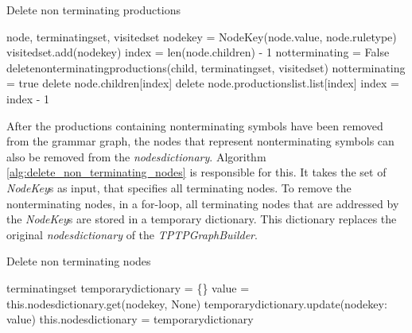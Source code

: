 \begin{algorithm}[H]
\caption{Delete non terminating productions}
\begin{algorithmic}[1] 
\Require node, terminating\textunderscore set, visited\textunderscore set
\State node\textunderscore key = Node\textunderscore Key(node.value, node.rule\textunderscore type)
	\State visited\textunderscore set.add(node\textunderscore key)
	\State index = len(node.children) - 1
		\State not\textunderscore terminating = False
			\State delete\textunderscore non\textunderscore terminating\textunderscore productions(child, terminating\textunderscore set, visited\textunderscore set)
				\State not\textunderscore terminating = true
			\EndIf
		\EndFor
			\State delete node.children[index]
			\State delete node.productions\textunderscore list.list[index]
		\EndIf
		\State index = index - 1
\EndFor
\EndIf
\end{algorithmic}
\label{alg:delete_non_terminating_productions}
\end{algorithm}

After the productions containing nonterminating symbols have been removed from the grammar graph, the nodes that represent nonterminating symbols can also be removed from the \textit{nodes\textunderscore dictionary}.
Algorithm \ref{alg:delete_non_terminating_nodes} is responsible for this. It takes the set of \textit{Node\textunderscore Key}s as input, that specifies all terminating nodes.
To remove the nonterminating nodes, in a for-loop, all terminating nodes that are addressed by the \textit{Node\textunderscore Key}s are stored in a temporary dictionary. This dictionary replaces the original \textit{nodes\textunderscore dictionary} of the \textit{TPTPGraphBuilder}.
\begin{algorithm}[H]
\caption{Delete non terminating nodes}
\begin{algorithmic}[1] 
\Require terminating\textunderscore set
\State temporary\textunderscore dictionary = \{\}
	\State value = this.nodes\textunderscore dictionary.get(node\textunderscore key, None)
	\State temporary\textunderscore dictionary.update({node\textunderscore key: value})
\EndFor
\State this.nodes\textunderscore dictionary = temporary\textunderscore dictionary
\end{algorithmic}
\label{alg:delete_non_terminating_nodes}
\end{algorithm}

